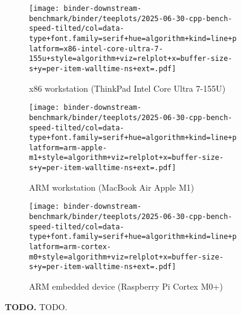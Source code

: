 \begin{figure*}

\begin{subfigure}{\linewidth}
\texttt{[image: binder-downstream-benchmark/binder/teeplots/2025-06-30-cpp-bench-speed-tilted/col=data-type+font.family=serif+hue=algorithm+kind=line+platform=x86-intel-core-ultra-7-155u+style=algorithm+viz=relplot+x=buffer-size-s+y=per-item-walltime-ns+ext=.pdf]}
\caption{x86 workstation (ThinkPad Intel Core Ultra 7-155U)}
\label{fig:speed-supp:thinkpad}
\end{subfigure}

\begin{subfigure}{\linewidth}
\texttt{[image: binder-downstream-benchmark/binder/teeplots/2025-06-30-cpp-bench-speed-tilted/col=data-type+font.family=serif+hue=algorithm+kind=line+platform=arm-apple-m1+style=algorithm+viz=relplot+x=buffer-size-s+y=per-item-walltime-ns+ext=.pdf]}%
\caption{ARM workstation (MacBook Air Apple M1)}
\label{fig:speed-supp:mac}
\end{subfigure}

\begin{subfigure}{\linewidth}
\texttt{[image: binder-downstream-benchmark/binder/teeplots/2025-06-30-cpp-bench-speed-tilted/col=data-type+font.family=serif+hue=algorithm+kind=line+platform=arm-cortex-m0+style=algorithm+viz=relplot+x=buffer-size-s+y=per-item-walltime-ns+ext=.pdf]}%
\caption{ARM embedded device (Raspberry Pi Cortex M0+)}
\label{fig:speed-supp:pi}
\end{subfigure}

\caption{%
\textbf{TODO.}
\small
TODO.
}
\label{fig:speed-supp}
\end{figure*}
